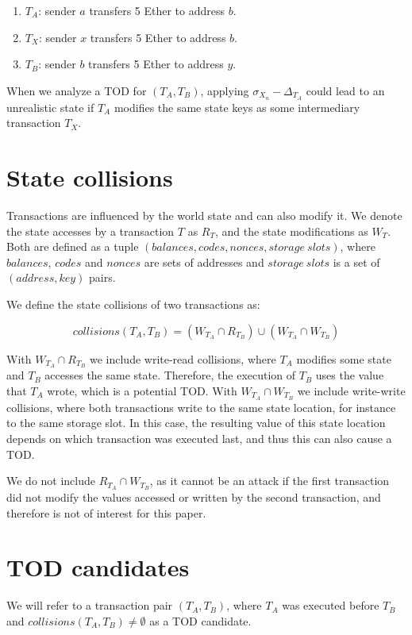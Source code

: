 \documentclass[draft,final]{vutinfth} %
\begin{document}
\begin{enumerate}
    \item $T_A$: sender $a$ transfers 5 Ether to address $b$.
    \item $T_X$: sender $x$ transfers 5 Ether to address $b$.
    \item $T_B$: sender $b$ transfers 5 Ether to address $y$.
\end{enumerate}

When we analyze a TOD for $(T_A, T_B)$, applying $\sigma_{X_n} - \Delta_{T_A}$ could lead to an unrealistic state if $T_A$ modifies the same state keys as some intermediary transaction $T_X$.

\section{State collisions}

Transactions are influenced by the world state and can also modify it. We denote the state accesses by a transaction $T$ as $R_T$, and the state modifications as $W_T$. Both are defined as a tuple $(balances, codes, nonces, storage\ slots)$, where $balances$, $codes$ and $nonces$ are sets of addresses and $storage\ slots$ is a set of $(address, key)$ pairs.

We define the state collisions of two transactions as:

$$collisions(T_A, T_B) = (W_{T_A} \cap R_{T_B}) \cup (W_{T_A} \cap W_{T_B})$$

With $W_{T_A} \cap R_{T_B}$ we include write-read collisions, where $T_A$ modifies some state and $T_B$ accesses the same state. Therefore, the execution of $T_B$ uses the value that $T_A$ wrote, which is a potential TOD. With $W_{T_A} \cap W_{T_B}$ we include write-write collisions, where both transactions write to the same state location, for instance to the same storage slot. In this case, the resulting value of this state location depends on which transaction was executed last, and thus this can also cause a TOD.

We do not include $R_{T_A} \cap W_{T_B}$, as it cannot be an attack if the first transaction did not modify the values accessed or written by the second transaction, and therefore is not of interest for this paper.

\section{TOD candidates}

We will refer to a transaction pair $(T_A, T_B)$, where $T_A$ was executed before $T_B$ and $collisions(T_A, T_B) \neq \emptyset$ as a TOD candidate.
\end{document}
